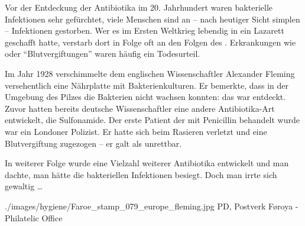 {%
Vor der Entdeckung der Antibiotika im 20. Jahrhundert waren bakterielle
Infektionen sehr gefürchtet, viele Menschen sind an -- nach heutiger Sicht simplen --
Infektionen gestorben. Wer es im Ersten Weltkrieg lebendig in ein Lazarett
geschafft hatte, verstarb dort in Folge  oft an den Folgen des .
Erkrankungen wie  oder "`Blutvergiftungen"' waren
häufig ein Todesurteil.

Im Jahr 1928 verschimmelte dem englischen Wissenschaftler Alexander Fleming
versehentlich eine Nährplatte mit Bakterienkulturen. Er bemerkte, dass in der
Umgebung des Pilzes die Bakterien nicht wachsen konnten: das  war
entdeckt. Zuvor hatten bereits deutsche Wissenschaftler eine andere
Antibiotika-Art entwickelt, die Sulfonamide. Der erste Patient der mit
Penicillin behandelt wurde war ein Londoner Polizist. Er hatte sich beim Rasieren verletzt und eine Blutvergiftung zugezogen -- er galt als unrettbar.~

In weiterer Folge wurde eine Vielzahl weiterer Antibiotika entwickelt und
man dachte, man hätte die bakteriellen Infektionen besiegt.
Doch man irrte sich gewaltig {\ldots}
}
{}
{./images/hygiene/Faroe_stamp_079_europe_fleming.jpg}
{}
{PD, Postverk Føroya -
Philatelic Office}



